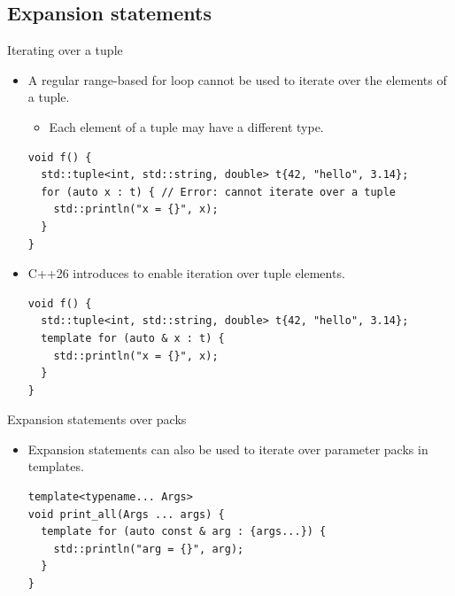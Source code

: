\subsection{Expansion statements}

\begin{frame}[t,fragile]{Iterating over a tuple}
\begin{itemize}
  \item A regular range-based for loop cannot be used to iterate over the elements of a tuple.
    \begin{itemize}
      \item Each element of a tuple may have a different type.
    \end{itemize}
\begin{lstlisting}
void f() {
  std::tuple<int, std::string, double> t{42, "hello", 3.14};
  for (auto x : t) { // Error: cannot iterate over a tuple
    std::println("x = {}", x);
  }
}
\end{lstlisting}

  \item C++26 introduces  to enable iteration over tuple elements.
\begin{lstlisting}
void f() {
  std::tuple<int, std::string, double> t{42, "hello", 3.14};
  template for (auto & x : t) {
    std::println("x = {}", x);
  }
}
\end{lstlisting}
\end{itemize}
\end{frame}

\begin{frame}[t,fragile]{Expansion statements over packs}
\begin{itemize}
  \item Expansion statements can also be used to iterate over parameter packs in templates.
\begin{lstlisting}
template<typename... Args>
void print_all(Args ... args) {
  template for (auto const & arg : {args...}) {
    std::println("arg = {}", arg);
  }
}
\end{lstlisting}
\end{itemize}
\end{frame}